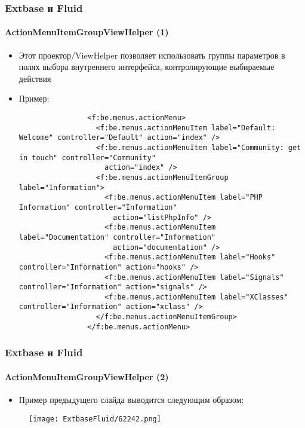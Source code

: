 \begin{frame}[fragile]
	\frametitle{Extbase и Fluid}
	\framesubtitle{ActionMenuItemGroupViewHelper (1)}

	\lstset{basicstyle=\tiny\ttfamily}

	\begin{itemize}

		\item Этот проектор/ViewHelper позволяет использовать группы параметров в полях выбора внутреннего интерфейса,
			контролирующие выбираемые действия

		\item Пример:
			\begin{lstlisting}
				<f:be.menus.actionMenu>
				  <f:be.menus.actionMenuItem label="Default: Welcome" controller="Default" action="index" />
				  <f:be.menus.actionMenuItem label="Community: get in touch" controller="Community"
				    action="index" />
				  <f:be.menus.actionMenuItemGroup label="Information">
				    <f:be.menus.actionMenuItem label="PHP Information" controller="Information"
				      action="listPhpInfo" />
				    <f:be.menus.actionMenuItem label="Documentation" controller="Information"
				      action="documentation" />
				    <f:be.menus.actionMenuItem label="Hooks" controller="Information" action="hooks" />
				    <f:be.menus.actionMenuItem label="Signals" controller="Information" action="signals" />
				    <f:be.menus.actionMenuItem label="XClasses" controller="Information" action="xclass" />
				  </f:be.menus.actionMenuItemGroup>
				</f:be.menus.actionMenu>
			\end{lstlisting}

	\end{itemize}

\end{frame}


\begin{frame}[fragile]
	\frametitle{Extbase и Fluid}
	\framesubtitle{ActionMenuItemGroupViewHelper (2)}

	\begin{itemize}
		\item Пример предыдущего слайда выводится следующим образом:
	\end{itemize}

	\begin{figure}
		\texttt{[image: ExtbaseFluid/62242.png]}
	\end{figure}

\end{frame}

